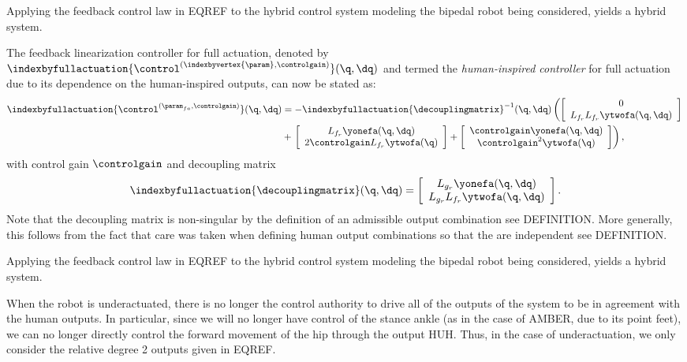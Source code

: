 Applying the feedback control law in EQREF to the hybrid control system modeling the bipedal robot being considered, yields a hybrid system.

The feedback linearization controller for full actuation, denoted by $\indexbyfullactuation{\control^{(\indexbyvertex{\param},\controlgain)}}(\q,\dq)$ and termed the \textit{human-inspired controller} for full actuation due to its dependence on the human-inspired outputs, can now be stated as:
\begin{align}
\nonumber
 \indexbyfullactuation{\control^{(\param_{fa},\controlgain)}}(\q,\dq)& = -\indexbyfullactuation{\decouplingmatrix}^{-1}(\q,\dq)  \left( \left[ \begin{array}{c} 0 \\ L_{f_r}L_{f_r}\ytwofa(\q,\dq) \end{array} \right]\right.  \\ &+ \left.\left[ \begin{array}{c} L_{f_r}\yonefa(\q, \dq) \\ 2 \controlgain L_{f_r}\ytwofa(\q) \end{array} \right] + \left[ \begin{array}{c} \controlgain \yonefa(\q,\dq) \\ \controlgain^2 \ytwofa(\q) \end{array} \right] \right),
 \nonumber
\end{align}
with control gain $\controlgain$ and decoupling matrix
\begin{align}
 \indexbyfullactuation{\decouplingmatrix}(\q,\dq) = \left[ \begin{array}{c} L_{g_r}\yonefa(\q, \dq) \\ L_{g_r}L_{f_r}\ytwofa(\q, \dq) \end{array} \right].
\end{align}
Note that the decoupling matrix is non-singular by the definition of an admissible output combination see DEFINITION. More generally, this follows from the fact that care was taken when defining human output combinations so that the are independent see DEFINITION.

Applying the feedback control law in EQREF to the hybrid control system modeling the bipedal robot being considered, yields a hybrid system.

 When the robot is underactuated, there is no longer the control authority to drive all of the outputs of the system to be in agreement with the human outputs. In particular, since we will no longer have control of the stance ankle (as in the case of AMBER, due to its point feet), we can no longer directly control the forward movement of the hip through the output HUH. Thus, in the case of underactuation, we only consider the relative degree 2 outputs given in EQREF.

